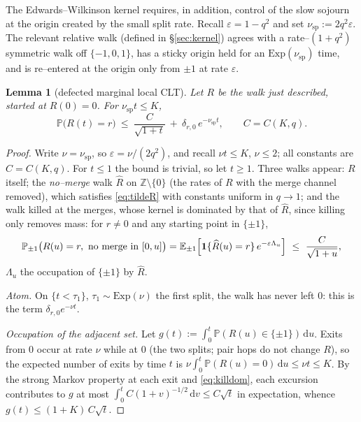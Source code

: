 \documentclass[11pt]{article}
\theoremstyle{plain}
\newtheorem{lemma}[theorem]{Lemma}
\theoremstyle{definition}
\theoremstyle{remark}
\newcommand{\Z}{\mathbb{Z}}\newcommand{\R}{\mathbb{R}}\newcommand{\N}{\mathbb{N}}
\newcommand{\E}{\mathbb{E}}\newcommand{\PP}{\mathbb{P}}\newcommand{\dd}{\,\mathrm{d}}
\newcommand{\eps}{\varepsilon}\newcommand{\Exp}{\mathrm{Exp}}
\begin{document}
The Edwards--Wilkinson kernel requires, in addition, control of the slow sojourn at the
origin created by the small split rate. Recall $\eps=1-q^2$ and set
$\nu_{\mathrm{sp}}:=2q^2\eps$. The relevant relative walk (defined in
\S\ref{sec:kernel}) agrees with a rate--$(1+q^2)$ symmetric walk off $\{-1,0,1\}$, has a
sticky origin held for an $\Exp(\nu_{\mathrm{sp}})$ time, and is re--entered at the
origin only from $\pm1$ at rate $\eps$.

\begin{lemma}[defected marginal local CLT]\label{lem:Rlclt}
Let $R$ be the walk just described, started at $R(0)=0$. For $\nu_{\mathrm{sp}}t\le K$,
\[
  \PP\big(R(t)=r\big)\ \le\ \frac{C}{\sqrt{1+t}}\ +\ \delta_{r,0}\,e^{-\nu_{\mathrm{sp}}t},
  \qquad C=C(K,q).
\]
\end{lemma}
\begin{proof}
Write $\nu=\nu_{\mathrm{sp}}$, so $\eps=\nu/(2q^2)$, and recall $\nu t\le K$,
$\nu\le2$; all constants are $C=C(K,q)$. For $t\le1$ the bound is trivial, so let
$t\ge1$. Three walks appear: $R$ itself; the \emph{no--merge} walk $\widehat R$ on
$\Z\setminus\{0\}$ (the rates of $R$ with the merge channel removed), which satisfies
\eqref{eq:tildeR} with constants uniform in $q\to1$; and the walk killed at the
merges, whose kernel is dominated by that of $\widehat R$, since killing only removes
mass: for $r\ne0$ and any starting point in $\{\pm1\}$,
\begin{equation}\label{eq:killdom}
  \PP_{\pm1}\big(R(u)=r,\ \text{no merge in }[0,u]\big)
  =\E_{\pm1}\Big[\bone\{\widehat R(u)=r\}\,e^{-\eps\Lambda_u}\Big]
  \ \le\ \frac{C}{\sqrt{1+u}},
\end{equation}
$\Lambda_u$ the occupation of $\{\pm1\}$ by $\widehat R$.

\emph{Atom.} On $\{t<\tau_1\}$, $\tau_1\sim\Exp(\nu)$ the first split, the walk has
never left $0$: this is the term $\delta_{r,0}e^{-\nu t}$.

\emph{Occupation of the adjacent set.} Let
$g(t):=\int_0^t\PP(R(u)\in\{\pm1\})\dd u$. Exits from $0$ occur at rate $\nu$ while at
$0$ (the two splits; pair hops do not change $R$), so the expected number of exits by
time $t$ is $\nu\int_0^t\PP(R(u)=0)\dd u\le\nu t\le K$. By the strong Markov property
at each exit and \eqref{eq:killdom}, each excursion contributes to $g$ at most
$\int_0^tC(1+v)^{-1/2}\dd v\le C\sqrt t$ in expectation, whence
$g(t)\le(1+K)\,C\sqrt t$.


\end{proof}
\end{document}
